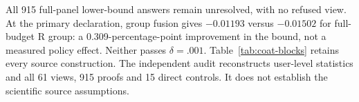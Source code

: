 All 915 full-panel lower-bound answers remain unresolved, with no refused view. At the primary declaration, group fusion gives $-0.01193$ versus $-0.01502$ for full-budget R group: a 0.309-percentage-point improvement in the bound, not a measured policy effect. Neither passes $\delta=.001$. Table~\ref{tab:coat-blocks} retains every source construction. The independent audit reconstructs user-level statistics and all 61 views, 915 proofs and 15 direct controls. It does not establish the scientific source assumptions.
